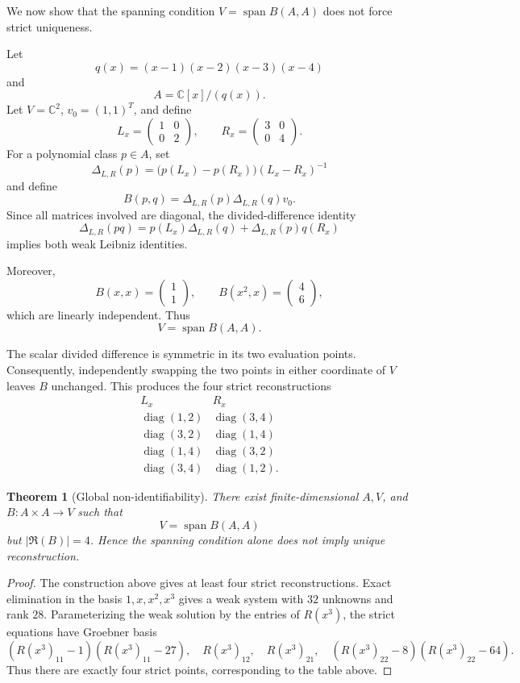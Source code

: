 \documentclass[11pt]{amsart}
\newtheorem{theorem}{Theorem}[section]
\newcommand{\Span}{\operatorname{span}}
\newcommand{\Rfib}{\mathfrak R}
\newcommand{\C}{\mathbb C}
\begin{document}
We now show that the spanning condition $V=\Span B(A,A)$ does not force strict uniqueness.

Let
\[
q(x)=(x-1)(x-2)(x-3)(x-4)
\]
and
\[
A=\C[x]/(q(x)).
\]
Let $V=\C^2$, $v_0=(1,1)^T$, and define
\[
L_x=\begin{pmatrix}1&0\\0&2\end{pmatrix},
\qquad
R_x=\begin{pmatrix}3&0\\0&4\end{pmatrix}.
\]
For a polynomial class $p\in A$, set
\[
\Delta_{L,R}(p)=\bigl(p(L_x)-p(R_x)\bigr)(L_x-R_x)^{-1}
\]
and define
\[
B(p,q)=\Delta_{L,R}(p)\Delta_{L,R}(q)v_0.
\]
Since all matrices involved are diagonal, the divided-difference identity
\[
\Delta_{L,R}(pq)=p(L_x)\Delta_{L,R}(q)+\Delta_{L,R}(p)q(R_x)
\]
implies both weak Leibniz identities.

Moreover,
\[
B(x,x)=\begin{pmatrix}1\\1\end{pmatrix},
\qquad
B(x^2,x)=\begin{pmatrix}4\\6\end{pmatrix},
\]
which are linearly independent.  Thus
\[
V=\Span B(A,A).
\]

The scalar divided difference is symmetric in its two evaluation points.  Consequently, independently swapping the two points in either coordinate of $V$ leaves $B$ unchanged.  This produces the four strict reconstructions
\[
\begin{array}{c|c}
L_x&R_x\\ \hline
\operatorname{diag}(1,2)&\operatorname{diag}(3,4)\\
\operatorname{diag}(3,2)&\operatorname{diag}(1,4)\\
\operatorname{diag}(1,4)&\operatorname{diag}(3,2)\\
\operatorname{diag}(3,4)&\operatorname{diag}(1,2).
\end{array}
\]

\begin{theorem}[Global non-identifiability]\label{thm:four-points}
There exist finite-dimensional $A,V$, and $B:A\times A\to V$ such that
\[
V=\Span B(A,A)
\]
but $|\Rfib(B)|=4$.  Hence the spanning condition alone does not imply unique reconstruction.
\end{theorem}

\begin{proof}
The construction above gives at least four strict reconstructions.  Exact elimination in the basis $1,x,x^2,x^3$ gives a weak system with $32$ unknowns and rank $28$.  Parameterizing the weak solution by the entries of $R(x^3)$, the strict equations have Groebner basis
\[
(R(x^3)_{11}-1)(R(x^3)_{11}-27),\quad
R(x^3)_{12},\quad R(x^3)_{21},\quad
(R(x^3)_{22}-8)(R(x^3)_{22}-64).
\]
Thus there are exactly four strict points, corresponding to the table above.
\end{proof}
\end{document}
